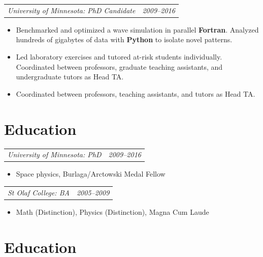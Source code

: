 \documentclass[12pt,letterpaper]{article}
\makeatletter
\newcommand{\headerpair}[2]{
    \begin{tabular*}{\linewidth}{l@{ \extracolsep{\fill} }r} {\large\emph{#1}} & {\large\emph{#2}}
    \end{tabular*}
}
\newcommand{\headerrow}[3]{\headerpair{#2: #1}{#3}}
\newcommand{\ResumeSection}[1]{\section*{{\color{MidnightBlue}\sout{\hfill} #1 \sout{\hfill}}}}
\makeatother
\begin{document}
\headerrow
    {PhD Candidate}
    {University of Minnesota}
    {2009--2016}
\begin{itemize}
    \item Benchmarked and optimized a wave simulation in parallel \textbf{Fortran}. Analyzed hundreds of gigabytes of data with \textbf{Python} to isolate novel patterns.


    \item Led laboratory exercises and tutored at-risk students individually. Coordinated between professors, graduate teaching assistants, and undergraduate tutors as Head TA.
    \item Coordinated between professors, teaching assistants, and tutors as Head TA.

\end{itemize}


\ResumeSection{Education}

\headerrow
    {PhD}
    {University of Minnesota}
    {2009--2016}
\begin{itemize}
    \item Space physics, Burlaga/Arctowski Medal Fellow
\end{itemize}

\headerrow
    {BA}
    {St Olaf College}
    {2005--2009}
\begin{itemize}
    \item Math (Distinction), Physics (Distinction), Magna Cum Laude
\end{itemize}

\ResumeSection{Education}
\end{document}
